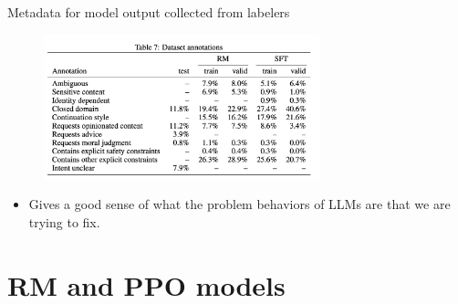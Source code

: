 \begin{vbframe}{Metadata for model output collected from labelers}

\vfill

\begin{figure}
\centering
\includegraphics[width = 8cm]{figure/instructgpttable3b.png}
\end{figure}

\begin{itemize}
	\item Gives a good sense of what the problem
	behaviors of LLMs are
	that we are trying to fix.
\end{itemize}

\vfill

\end{vbframe}

%




\section{RM and PPO models}








